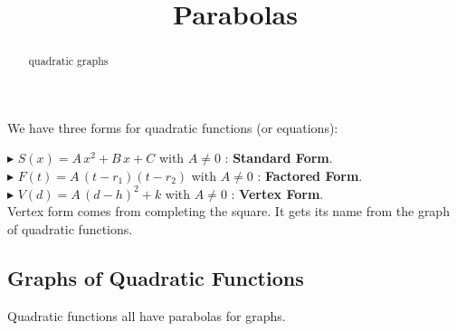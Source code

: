 \documentclass{ximera}
\title{Parabolas}
\begin{document}
\begin{abstract}
quadratic graphs
\end{abstract}
\maketitle





We have three forms for quadratic functions (or equations):



$\blacktriangleright$ $S(x) = A \, x^2 + B \, x + C$  with $A \ne 0$ : \textbf{\textcolor{blue!55!black}{Standard Form}}. \\


$\blacktriangleright$ $F(t) = A \, (t - r_1)(t - r_2)$  with $A \ne 0$ : \textbf{\textcolor{blue!55!black}{Factored Form}}. \\


$\blacktriangleright$ $V(d) = A \, (d - h)^2 + k$  with $A \ne 0$ : \textbf{\textcolor{blue!55!black}{Vertex Form}}. \\




Vertex form comes from completing the square.  It gets its name from the graph of quadratic functions.









\subsection*{Graphs of Quadratic Functions}



Quadratic functions all have parabolas for graphs.
\end{document}
